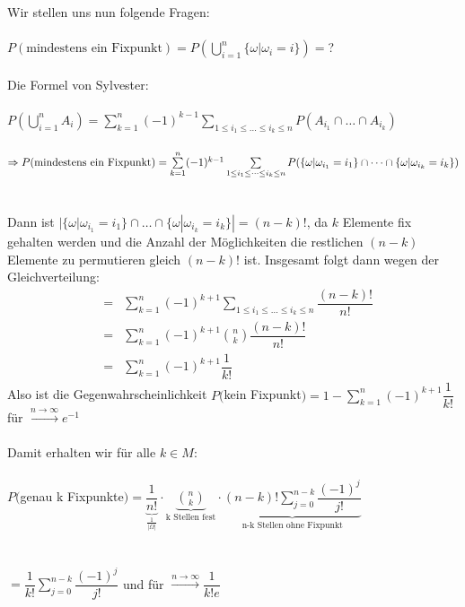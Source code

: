 \documentclass[10pt,a4paper]{report}
\numberwithin{equation}{section}
\numberwithin{figure}{section}
\theoremstyle{plain}
\theoremstyle{definition}
\theoremstyle{plain}
\theoremstyle{definition}
\theoremstyle{remark}
\theoremstyle{plain}
\theoremstyle{plain}
\theoremstyle{plain}
\newcommand{\1}{ \mathbb{1} } %
\begin{document}
 Wir stellen uns nun folgende Fragen:\\\\
 $P(\text{mindestens ein Fixpunkt})=P\left(\bigcup\limits_{i=1}^n \{\omega|\omega_i=i\}\right)=$?\\\\
Die Formel von Sylvester:\\\\
$P\left(\bigcup\limits_{i=1}^nA_i\right)=\sum\limits_{k=1}^n(-1)^{k-1}\sum\limits_{1\leq i_1 \leq \dots \leq i_k \leq n}P(A_{i_1}\cap\dots\cap A_{i_k})$\\\\
$\Rightarrow P(\text{mindestens ein Fixpunkt})\\\\
=\sum\limits_{k=1}^n(-1)^{k-1}\sum\limits_{1\leq i_1 \leq \dots \leq i_k \leq n}P(\{\omega|\omega_{i_1}=i_1\}\cap\dots\cap \{\omega|\omega_{i_k}=i_k\})$\\\\\\
Dann ist $|\{\omega|\omega_{i_1}=i_1\}\cap\dots\cap \{\omega|\omega_{i_k}=i_k\}|=(n-k)!$, da $k$ Elemente fix gehalten werden und die Anzahl der Möglichkeiten die restlichen $(n-k)$ Elemente zu permutieren gleich $(n-k)!$ ist. Insgesamt folgt dann wegen der Gleichverteilung:
\begin{eqnarray*}
&=&\sum\limits_{k=1}^n(-1)^{k+1}\sum\limits_{1\leq i_1 \leq \dots \leq i_k \leq n}\dfrac{(n-k)!}{n!}\\
&=&\sum\limits_{k=1}^n(-1)^{k+1}\binom{n}{k}\dfrac{(n-k)!}{n!}\\
&=&\sum\limits_{k=1}^n(-1)^{k+1}\dfrac{1}{k!}
\end{eqnarray*}
Also ist die Gegenwahrscheinlichkeit $P($kein Fixpunkt$)=1-\sum\limits_{k=1}^n(-1)^{k+1}\dfrac{1}{k!}$ für $\overset{n \to \infty}{\rightarrow} e^{-1}$\\\\
Damit erhalten wir für alle $k \in M$:\\\\
$P($genau k Fixpunkte$)=\underbrace{\dfrac{1}{n!}}_\frac{1}{|\Omega|}\cdot \underbrace{\binom{n}{k}}_{\text{k Stellen fest}}\cdot \underbrace{(n-k)!\sum\limits_{j=0}^{n-k}\dfrac{(-1)^j}{j!}}_{\text{n-k Stellen ohne Fixpunkt}}$\\\\\\
$=\dfrac{1}{k!}\sum\limits_{j=0}^{n-k}\dfrac{(-1)^j}{j!}$ und für $\overset{n \to \infty}{\rightarrow} \dfrac{1}{k!e}$ \\\\
\end{document}
